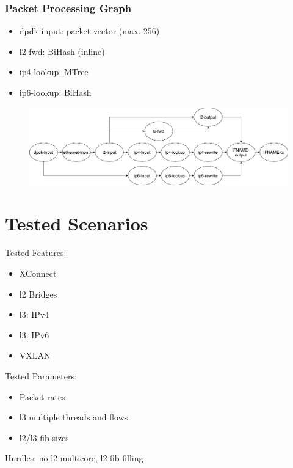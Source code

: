 \begin{frame}
    \frametitle{Packet Processing Graph}

    \begin{itemize}
        \item{dpdk-input: packet vector (max. 256)}
        \item{l2-fwd: BiHash (inline)}
        \item{ip4-lookup: MTree}
        \item{ip6-lookup: BiHash}
    \end{itemize}

    \begin{figure}
    \noindent\hspace{1mm}\includegraphics[width=\linewidth]{pics/vpp-nodes-horizontal.png}
    \label{nodegraph}
    \end{figure}
\end{frame}

\section{Tested Scenarios}

\begin{frame}

    Tested Features:
    \begin{itemize}
        \item XConnect
        \item l2 Bridges
        \item l3: IPv4
        \item l3: IPv6
        \item VXLAN
    \end{itemize}

    Tested Parameters: 
    \begin{itemize}
        \item Packet rates
        \item l3 multiple threads and flows
        \item l2/l3 fib sizes
    \end{itemize}

    Hurdles: no l2 multicore, l2 fib filling


\end{frame}

